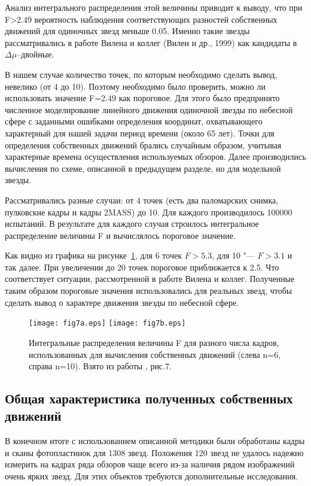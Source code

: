 Анализ интегрального распределения этой величины приводит к выводу, что при F>2.49 вероятность наблюдения соответствующих разностей собственных движений для одиночных звезд меньше 0.05. Именно такие звезды рассматривались в работе Вилена и коллег (Вилен и др., 1999) как кандидаты в $\Delta\mu$--двойные.

В нашем случае количество точек, по которым необходимо сделать вывод, невелико (от 4 до 10). Поэтому необходимо было проверить, можно ли использовать значение F=2.49 как пороговое. Для этого было предпринято численное моделирование линейного движения одиночной звезды по небесной сфере с заданными ошибками определения координат, охватывающего характерный для нашей задачи период времени (около 65 лет). Точки для определения собственных движений брались случайным образом, учитывая характерные времена осуществления используемых обзоров. Далее производились вычисления по схеме, описанной в предыдущем разделе, но для модельной звезды.

Рассматривались разные случаи: от 4 точек (есть два паломарских снимка, пулковские кадры и кадры 2MASS) до 10. Для каждого производилось 100000 испытаний. В результате для каждого случая строилось интегральное распределение величины F и вычислялось пороговое значение.

Как видно из графика на рисунке~\ref{fig:15Fint}, для 6 точек $F>5.3$, для 10 "--- $F>3.1$ и так далее. При увеличении до 20 точек пороговое приближается к 2.5. Что соответствует ситуации, рассмотренной в работе Вилена и коллег. Полученные таким образом пороговые значения использовались для реальных звезд, чтобы сделать вывод о характере движения звезды по небесной сфере.

\begin{figure}[h]
\centering
\texttt{[image: fig7a.eps]}
\texttt{[image: fig7b.eps]}
\caption{Интегральные распределения величины F для разного числа кадров, использованных для вычисления собственных движений (слева n=6, справа n=10). Взято из работы \cite{2015AstL...41..833K}, рис.7.}
\label{fig:15Fint}
\end{figure}
\subsection{Общая характеристика полученных собственных движений} \label{subsec:ch3/sect3/sub2}
В конечном итоге с использованием описанной методики были обработаны кадры и сканы фотопластинок для 1308 звезд. Положения 120 звезд не удалось надежно измерить на кадрах ряда обзоров чаще всего из-за наличия рядом изображений очень ярких звезд. Для этих объектов требуются дополнительные исследования.

